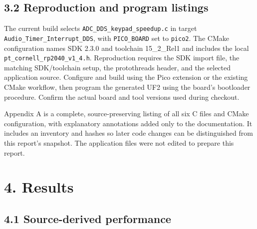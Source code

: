 \documentclass[11pt,letterpaper]{article}
\begin{document}
\subsection*{3.2 Reproduction and program listings}

The current build selects \texttt{ADC\_DDS\_keypad\_speedup.c} in target \texttt{Audio\_Timer\_Interrupt\_DDS}, with \texttt{PICO\_BOARD} set to \texttt{pico2}. The CMake configuration names SDK 2.3.0 and toolchain 15\_2\_Rel1 and includes the local \texttt{pt\_cornell\_rp2040\_v1\_4.h}. Reproduction requires the SDK import file, the matching SDK/toolchain setup, the protothreads header, and the selected application source. Configure and build using the Pico extension or the existing CMake workflow, then program the generated UF2 using the board's bootloader procedure. Confirm the actual board and tool versions used during checkout.

Appendix A is a complete, source-preserving listing of all six C files and CMake configuration, with explanatory annotations added only to the documentation. It includes an inventory and hashes so later code changes can be distinguished from this report's snapshot. The application files were not edited to prepare this report.

\section*{4. Results}

\subsection*{4.1 Source-derived performance}
\end{document}

